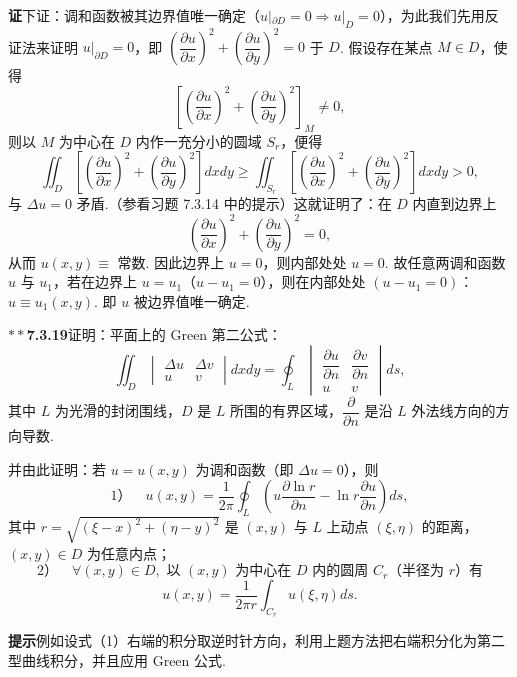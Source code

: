 \documentclass[UTF8, 12pt, fontset=fandol, oneside]{ctexart}
\begin{document}
\noindent\textbf{证}\quad 下证：调和函数被其边界值唯一确定（$u|_{\partial D}=0\Rightarrow u|_D=0$），为此我们先用反证法来证明 $u|_{\partial D}=0$，即 $\left(\dfrac{\partial u}{\partial x}\right)^2+\left(\dfrac{\partial u}{\partial y}\right)^2=0$ 于 $D$. 假设存在某点 $M\in D$，使得
\[
\left[\left(\frac{\partial u}{\partial x}\right)^2
+\left(\frac{\partial u}{\partial y}\right)^2\right]_M\ne0,
\]
则以 $M$ 为中心在 $D$ 内作一充分小的圆域 $S_r$，便得
\[
\iint_D\left[\left(\frac{\partial u}{\partial x}\right)^2
+\left(\frac{\partial u}{\partial y}\right)^2\right]dxdy
\ge
\iint_{S_r}\left[\left(\frac{\partial u}{\partial x}\right)^2
+\left(\frac{\partial u}{\partial y}\right)^2\right]dxdy>0,
\]
与 $\Delta u=0$ 矛盾.（参看习题 7.3.14 中的提示）这就证明了：在 $D$ 内直到边界上
\[
\left(\frac{\partial u}{\partial x}\right)^2
+\left(\frac{\partial u}{\partial y}\right)^2=0,
\]
从而 $u(x,y)\equiv$ 常数. 因此边界上 $u=0$，则内部处处 $u=0$. 故任意两调和函数 $u$ 与 $u_1$，若在边界上 $u=u_1$（$u-u_1=0$），则在内部处处 $(u-u_1=0)$：$u\equiv u_1(x,y)$. 即 $u$ 被边界值唯一确定.

\noindent\textbf{$**$7.3.19}\quad 证明：平面上的 Green 第二公式：
\begin{equation}
\iint_D
\begin{vmatrix}
\Delta u & \Delta v\\
u & v
\end{vmatrix}
dxdy
=\oint_L
\begin{vmatrix}
\dfrac{\partial u}{\partial n} & \dfrac{\partial v}{\partial n}\\
u & v
\end{vmatrix}ds,
\tag{1}
\end{equation}
其中 $L$ 为光滑的封闭围线，$D$ 是 $L$ 所围的有界区域，$\dfrac{\partial}{\partial n}$ 是沿 $L$ 外法线方向的方向导数.

并由此证明：若 $u=u(x,y)$ 为调和函数（即 $\Delta u=0$），则
\[
1）\quad
u(x,y)=\frac1{2\pi}\oint_L\left(u\frac{\partial\ln r}{\partial n}
-\ln r\frac{\partial u}{\partial n}\right)ds,
\tag{2}
\]
其中 $r=\sqrt{(\xi-x)^2+(\eta-y)^2}$ 是 $(x,y)$ 与 $L$ 上动点 $(\xi,\eta)$ 的距离，$(x,y)\in D$ 为任意内点；
\[
2）\quad
\forall (x,y)\in D,\text{ 以 }(x,y)\text{ 为中心在 }D\text{ 内的圆周 }C_r\text{（半径为 }r\text{）有}
\]
\[
u(x,y)=\frac1{2\pi r}\int_{C_r}u(\xi,\eta)ds.
\tag{3}
\]

\noindent\textbf{提示}\quad 例如设式（1）右端的积分取逆时针方向，利用上题方法把右端积分化为第二型曲线积分，并且应用 Green 公式.
\end{document}

